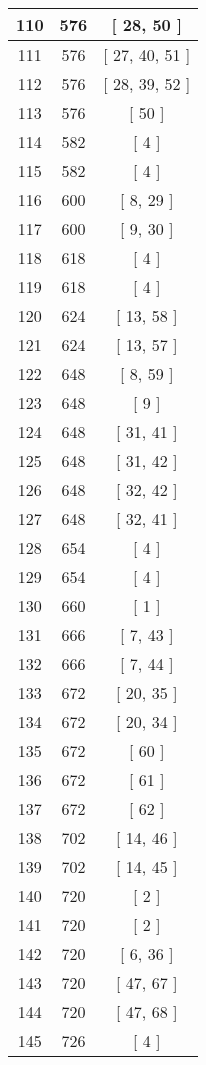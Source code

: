 \begin{center}
\begin{longtable}[H]{|| c c c ||}
\hline
110 & 576 & [ 28, 50 ] \\ 
\hline
111 & 576 & [ 27, 40, 51 ] \\ 
\hline
112 & 576 & [ 28, 39, 52 ] \\ 
\hline
113 & 576 & [ 50 ] \\ 
\hline
114 & 582 & [ 4 ] \\ 
\hline
115 & 582 & [ 4 ] \\ 
\hline
116 & 600 & [ 8, 29 ] \\ 
\hline
117 & 600 & [ 9, 30 ] \\ 
\hline
118 & 618 & [ 4 ] \\ 
\hline
119 & 618 & [ 4 ] \\ 
\hline
120 & 624 & [ 13, 58 ] \\ 
\hline
121 & 624 & [ 13, 57 ] \\ 
\hline
122 & 648 & [ 8, 59 ] \\ 
\hline
123 & 648 & [ 9 ] \\ 
\hline
124 & 648 & [ 31, 41 ] \\ 
\hline
125 & 648 & [ 31, 42 ] \\ 
\hline
126 & 648 & [ 32, 42 ] \\ 
\hline
127 & 648 & [ 32, 41 ] \\ 
\hline
128 & 654 & [ 4 ] \\ 
\hline
129 & 654 & [ 4 ] \\ 
\hline
130 & 660 & [ 1 ] \\ 
\hline
131 & 666 & [ 7, 43 ] \\ 
\hline
132 & 666 & [ 7, 44 ] \\ 
\hline
133 & 672 & [ 20, 35 ] \\ 
\hline
134 & 672 & [ 20, 34 ] \\ 
\hline
135 & 672 & [ 60 ] \\ 
\hline
136 & 672 & [ 61 ] \\ 
\hline
137 & 672 & [ 62 ] \\ 
\hline
138 & 702 & [ 14, 46 ] \\ 
\hline
139 & 702 & [ 14, 45 ] \\ 
\hline
140 & 720 & [ 2 ] \\ 
\hline
141 & 720 & [ 2 ] \\ 
\hline
142 & 720 & [ 6, 36 ] \\ 
\hline
143 & 720 & [ 47, 67 ] \\ 
\hline
144 & 720 & [ 47, 68 ] \\ 
\hline
145 & 726 & [ 4 ] \\ 
\hline

\end{longtable}
\end{center}
